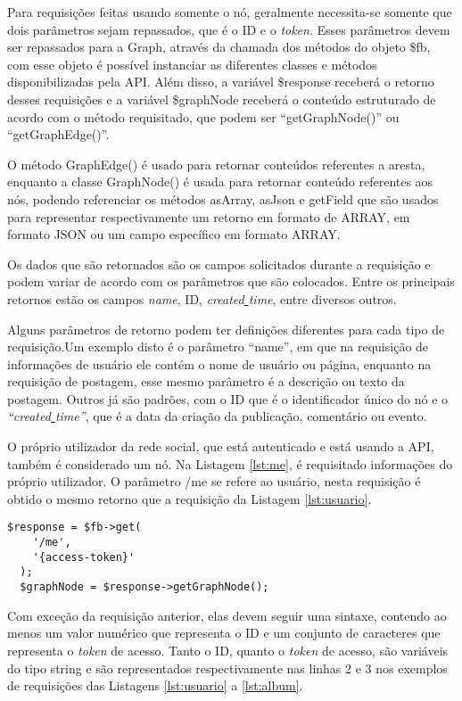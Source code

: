 Para requisições feitas usando somente o nó, geralmente necessita-se somente que dois parâmetros sejam repassados, que é o ID e o \textit{token}. Esses parâmetros devem ser repassados para a Graph, através da chamada dos métodos do objeto \$fb, com esse objeto é possível instanciar as diferentes classes e métodos disponibilizadas pela API. Além disso, a variável \$response receberá o retorno desses requisições e a variável \$graphNode receberá o conteúdo estruturado de acordo com o método requisitado, que podem ser ``getGraphNode()'' ou ``getGraphEdge()''.

O método GraphEdge() é usado para retornar conteúdos referentes a aresta, enquanto a classe GraphNode() é usada para retornar conteúdo referentes aos nós, podendo referenciar os métodos asArray, asJson e getField que são usados para representar respectivamente um retorno em formato de ARRAY, em formato JSON ou um campo específico em formato ARRAY.

Os dados que são retornados são os campos solicitados durante a requisição e podem variar de acordo com os parâmetros que são colocados. Entre os principais retornos estão os campos \textit{name}, ID, \textit{created\underline{{ }}time}, entre diversos outros. 

Alguns parâmetros de retorno podem ter definições diferentes para cada tipo de requisição.Um exemplo disto é o parâmetro ``name'', em que na requisição de informações de usuário ele contém o nome de usuário ou página, enquanto na requisição de postagem, esse mesmo parâmetro é a descrição ou texto da postagem. Outros já são padrões, com o ID que é o identificador único do nó e o \textit{``created\underline{{ }}time''}, que é a data da criação da publicação, comentário ou evento.

O próprio utilizador da rede social, que está autenticado e está usando a API, também é considerado um nó. Na Listagem \ref{lst:me}, é requisitado informações do próprio utilizador. O parâmetro /me se refere ao usuário, nesta requisição é obtido o mesmo retorno que a requisição da Listagem \ref{lst:usuario}.

\begin{lstlisting}[caption={Requisitar informações do próprio usuário},label={lst:me}]
  $response = $fb->get(
    '/me',
    '{access-token}'
  );
  $graphNode = $response->getGraphNode();
\end{lstlisting}

Com exceção da requisição anterior, elas devem seguir uma sintaxe, contendo ao menos um valor numérico que representa o ID e um conjunto de caracteres que representa o \textit{token} de acesso. Tanto o ID, quanto o \textit{token} de acesso, são variáveis do tipo string e são representados respectivamente nas linhas 2 e 3 nos exemplos de requisições das Listagens \ref{lst:usuario} a \ref{lst:album}.

